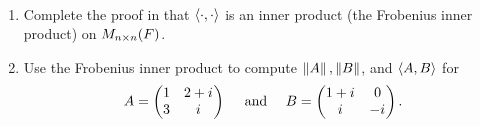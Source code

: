 \begin{exercise} \label{exercise 6.1.4} \ 

\begin{enumerate}
\item Complete the proof in  that \(\left< \cdot , \cdot \right>\) is an inner product (the Frobenius inner product) on \(M_{n \times n}(F)\).
\item Use the Frobenius inner product to compute \(\left\lVert A\right\rVert, \left\lVert B\right\rVert\), and \(\left< A, B \right>\) for
\[
    A = \begin{pmatrix} 1 & 2 + {i\mkern1mu} \\ 3 & {i\mkern1mu} \end{pmatrix}
    \quad \text{ and } \quad
    B = \begin{pmatrix} 1 + {i\mkern1mu} & 0 \\ {i\mkern1mu} & -{i\mkern1mu} \end{pmatrix}.
\]
\end{enumerate}
\end{exercise}

